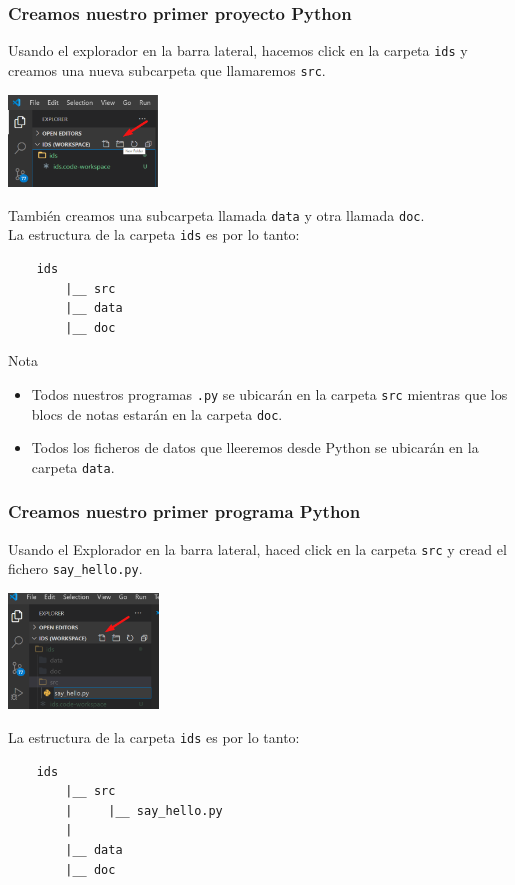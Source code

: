 \documentclass[9pt]{beamer}
\newcommand{\workspacefolder}{ids}
\begin{document}
    \begin{frame}[fragile]
  \frametitle{Creamos nuestro primer proyecto Python}
  Usando el explorador en la barra lateral, hacemos click en la
  carpeta  {\tt \workspacefolder} y creamos una nueva subcarpeta que llamaremos {\tt src}.
  \begin{center}
\includegraphics[width=4cm]{vs_code_create_folder}    
  \end{center}
  También creamos una subcarpeta llamada {\tt data} y otra
  llamada {\tt doc}.\\
  La estructura de la carpeta {\tt \workspacefolder} es por lo tanto:
\begin{verbatim}
    ids
        |__ src
        |__ data
        |__ doc
\end{verbatim}
  \begin{block}{Nota}
    \begin{itemize}
    \item     Todos nuestros programas {\tt .py} se ubicarán en la
      carpeta {\tt src} mientras que los blocs de notas estarán en la
      carpeta {\tt doc}.
  \item Todos los ficheros de datos que lleeremos desde Python se
    ubicarán en la carpeta {\tt data}.
    \end{itemize}
    
  \end{block}
\end{frame}
\begin{frame}[fragile]
  \frametitle{Creamos nuestro primer programa Python}
  Usando el Explorador en la barra lateral, haced click en la carpeta
  {\tt src} y cread el fichero {\tt say\_hello.py}.
  \begin{center}
\includegraphics[width=4cm]{vs_code_create_file}    
  \end{center}
  \pause
   La estructura de la carpeta {\tt \workspacefolder} es por lo tanto:
\begin{verbatim}
    ids
        |__ src
        |     |__ say_hello.py
        |
        |__ data
        |__ doc
\end{verbatim}
\end{frame}
\end{document}
